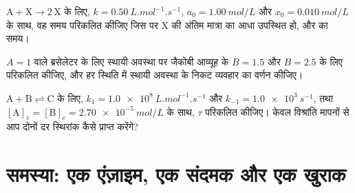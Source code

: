 \begin{exercise}[$\star\star\star$]\label{exo:b3:complex-kinetics:10}
$\mathrm{A + X \to 2\,X}$ के लिए, $k = \qty{0.50}{L.mol^{-1}.s^{-1}}$, $a_0 = \qty{1.00}{mol/L}$ और $x_0 = \qty{0.010}{mol/L}$ के साथ,
वह समय परिकलित कीजिए जिस पर X की अंतिम मात्रा का आधा उपस्थित हो, और
 का समय।
\end{exercise}

\begin{exercise}[$\star\star\star$]\label{exo:b3:complex-kinetics:11}
$A = 1$ वाले ब्रसेलेटर के लिए स्थायी अवस्था पर जैकोबी आव्यूह के 
$B = 1.5$ और $B = 2.5$ के लिए परिकलित कीजिए, और हर स्थिति में स्थायी
अवस्था के निकट व्यवहार का वर्णन कीजिए।
\end{exercise}

\begin{exercise}[$\star\star\star$]\label{exo:b3:complex-kinetics:12}
$\mathrm{A + B \rightleftharpoons C}$ के लिए, $k_1 = \qty{1.0e8}{L.mol^{-1}.s^{-1}}$ और $k_{-1} = \qty{1.0e3}{s^{-1}}$, तथा
$[\mathrm A]_e = [\mathrm B]_e = \qty{2.70e-5}{mol/L}$ के साथ, $\tau$ परिकलित कीजिए। केवल विश्रांति
मापनों से आप दोनों दर स्थिरांक कैसे प्राप्त करेंगे?
\end{exercise}

\section{समस्या: एक एंज़ाइम, एक संदमक और एक खुराक}

